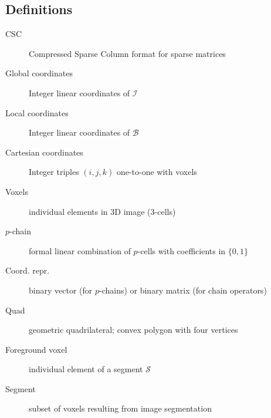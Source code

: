 \documentclass[11pt, oneside]{article}   	%
\begin{document}
\subsection{Definitions}
\begin{description}
\item[CSC]  Compressed Sparse Column format for sparse matrices
\\[-8mm]
\item[Global coordinates]  Integer linear coordinates of $\mathcal{I}$
\\[-8mm]
\item[Local coordinates] Integer linear coordinates of $\mathcal{B}$
\\[-8mm]
\item[Cartesian coordinates] Integer triples $(i,j,k)$ one-to-one with voxels 
\\[-8mm]
\item[Voxels] individual elements in 3D image (3-cells)
\\[-8mm]
\item[$p$-chain] formal linear combination of $p$-cells with coefficients in $\{0,1\}$
\\[-8mm]
\item[Coord. repr.]  binary vector (for $p$-chains) or binary matrix (for chain operators)
\\[-8mm]
\item[Quad]	geometric quadrilateral; convex polygon with four vertices 
\\[-8mm]
\item[Foreground voxel] individual element of a segment $\mathcal{S}$
\\[-8mm]
\item[Segment]	subset of voxels resulting from image segmentation
\end{description}




\end{document}
